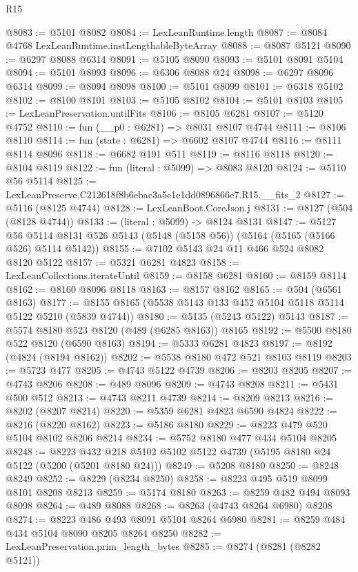 \begin{lexlean}{R15}
\begin{coremodule}
{{{{{{{{{{{@8083 := @5101 @8082
@8084 := LexLeanRuntime.length
@8087 := @8084 @4768 LexLeanRuntime.instLengthableByteArray
@8088 := @8087 @5121
@8090 := @6297 @8088 @6314
@8091 := @5105 @8090
@8093 := @5101 @8091 @5104
@8094 := @5101 @8093
@8096 := @6306 @8088 @24
@8098 := @6297 @8096 @6314
@8099 := @8094 @8098
@8100 := @5101 @8099
@8101 := @6318 @5102
@8102 := @8100 @8101
@8103 := @5105 @8102
@8104 := @5101 @8103
@8105 := LexLeanPreservation.untilFits
@8106 := @8105 @6281
@8107 := @5120 @4752
@8110 := fun (__p0 : @6281) => @8031 @8107 @4744
@8111 := @8106 @8110
@8114 := fun (state : @6281) => @6602 @8107 @4744
@8116 := @8111 @8114 @8096
@8118 := @6682 @191 @511
@8119 := @8116 @8118
@8120 := @8104 @8119
@8122 := fun (literal : @5099) => @8083 @8120
@8124 := @5110 @56 @5114
@8125 := LexLeanPreserve.C212618f8b6ebac3a5c1e1dd0896866e7.R15.__fits_2
@8127 := @5116 (@8125 @4744)
@8128 := LexLeanBoot.CoreJson.j
@8131 := @8127 (@504 (@8128 @4744))
@8133 := (literal : @5099) -> @8124 @8131
@8147 := @5127
    @56
    @5114
    @8131
    @526
    @5143
    (@5148 (@5158 @56))
    (@5164 (@5165 (@5166 @526) @5114 @5142))
@8155 := @7102 @5143 @24 @11 @466 @524 @8082 @8120 @5122
@8157 := @5321 @6281 @4823
@8158 := LexLeanCollections.iterateUntil
@8159 := @8158 @6281
@8160 := @8159 @8114
@8162 := @8160 @8096 @8118
@8163 := @8157 @8162
@8165 := @504 (@6561 @8163)
@8177 := @8155 @8165 (@5538 @5143 @133 @452 @5104 @5118 @5114 @5122 @5210 (@5839 @4744))
@8180 := @5135 (@5243 @5122) @5143
@8187 := @5574 @8180 @523 @8120 (@489 (@6285 @8163)) @8165
@8192 := @5500 @8180 @522 @8120 (@6590 @8163)
@8194 := @5333 @6281 @4823
@8197 := @8192 (@4824 (@8194 @8162))
@8202 := @5538 @8180 @472 @521 @8103 @8119
@8203 := @5723 @477
@8205 := @4743 @5122 @4739
@8206 := @8203 @8205
@8207 := @4743 @8206
@8208 := @489 @8096
@8209 := @4743 @8208
@8211 := @5431 @500 @512
@8213 := @4743 @8211 @4739
@8214 := @8209 @8213
@8216 := @8202 (@8207 @8214)
@8220 := @5359 @6281 @4823 @6590 @4824
@8222 := @8216 (@8220 @8162)
@8223 := @5186 @8180
@8229 := @8223 @479 @520 @5104 @8102 @8206 @8214
@8234 := @5752 @8180 @477 @434 @5104 @8205
@8248 := @8223 @432 @218 @5102 @5102 @5122 @4739 (@5195 @8180 @24 @5122 (@5200 (@5201 @8180 @24)))
@8249 := @5208 @8180
@8250 := @8248 @8249
@8252 := @8229 (@8234 @8250)
@8258 := @8223 @495 @519 @8099 @8101 @8208 @8213
@8259 := @5174 @8180
@8263 := @8259 @482 @494 @8093 @8098
@8264 := @489 @8088
@8268 := @8263 (@4743 @8264 @6980) @8208
@8274 := @8223 @486 @493 @8091 @5104 @8264 @6980
@8281 := @8259 @484 @434 @5104 @8090 @8205 @8264 @8250
@8282 := LexLeanPreservation.prim_length_bytes
@8285 := @8274 (@8281 (@8282 @5121))
}}}}}}}}}}}
\end{coremodule}
\end{lexlean}
